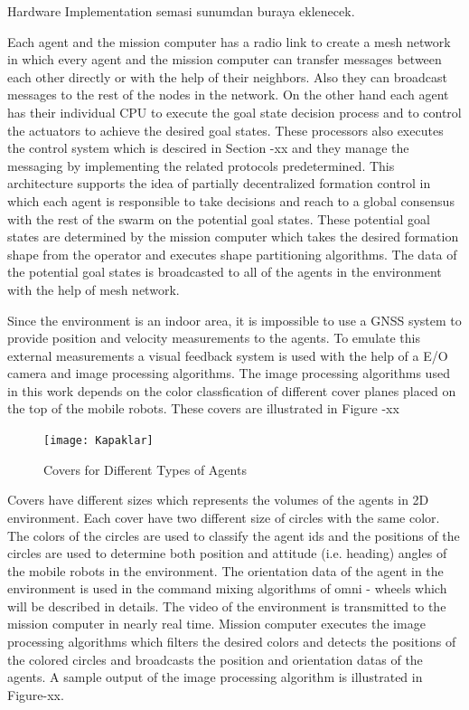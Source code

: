 \documentclass[twoside]{article}
\begin{document}
   Hardware Implementation semasi sunumdan buraya eklenecek.
   
Each agent and the mission computer has a radio link to create a mesh network in which every agent and the mission computer can transfer messages between each other directly or with the help of their neighbors. Also they can broadcast messages to the rest of the nodes in the network.  On the other hand each agent has their individual CPU to execute the goal state decision process and to control the actuators to achieve the desired goal states. These processors also executes the control system which is descired in Section -xx and they manage the messaging by implementing the related protocols predetermined.  This architecture supports the idea of partially decentralized formation control in which each agent is responsible to take decisions and reach to a global consensus with the rest of the swarm on the potential goal states.  These potential goal states are determined by the mission computer which takes the desired formation shape from the operator and executes shape partitioning algorithms. The data of the potential goal states is broadcasted to all of the agents in the environment with the help of mesh network. 

Since the environment is an indoor area, it is impossible to use a GNSS system to provide position and velocity measurements to the agents. To emulate this external measurements a visual feedback system is used with the help of a E/O camera and image processing algorithms.  The image processing algorithms used in this work depends on the color classfication of different cover planes placed on the top of the mobile robots. These covers are illustrated in Figure -xx


		
			\begin{figure}[H]
				\caption{Covers for Different Types of Agents}
				\centerline{\texttt{[image: Kapaklar]}}
			\end{figure} 
		
		
		Covers have different sizes which represents the volumes of the agents in 2D environment. Each cover have two different size of circles with the same color. The colors of the circles are used to classify the agent ids and the positions of the circles are used to determine both position and attitude (i.e. heading) angles of the mobile robots in the environment. The orientation data of the agent in the environment is used in the command mixing algorithms of omni - wheels which will be described in details. The video of the environment is transmitted to the mission computer in nearly real time. Mission computer executes the image processing algorithms which filters the desired colors and detects the positions of the colored circles and broadcasts the position and orientation datas of the agents. A sample output of the image processing algorithm is illustrated in Figure-xx. 
		
\end{document}
